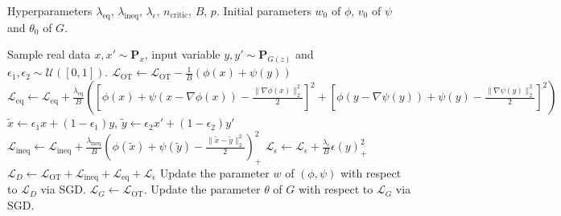 \documentclass[runningheads]{llncs}
\begin{document}
\begin{algorithm}[t]
  \caption{W2GAN with $D = (\phi, \psi)$ and $L^2$-regularization.}
  \label{alg:example2}
\begin{algorithmic}
  \REQUIRE Hyperparameters $\lambda_\mathrm{eq}$, $\lambda_\mathrm{ineq}$, $\lambda_{\epsilon}$, $n_\mathrm{critic}$, $B$, $p$.
  \REQUIRE Initial parameters $w_0$ of $\phi$, $v_0$ of $\psi$ and $\theta_0$ of $G$.
  
  \STATE Sample real data $x,x' \sim \mathbf{P}_x$, input variable $y,y' \sim \mathbf{P}_{G(z)}$ and $\epsilon_1, \epsilon_2 \sim \mathcal{U}([0,1])$.
  \STATE $\mathcal{L}_{\text{OT}} \leftarrow \mathcal{L}_{\text{OT}} - \frac{1}{B}(\phi(x) + \psi(y))$
  \STATE $\mathcal{L}_{\text{eq}} \leftarrow \mathcal{L}_{\text{eq}} + \frac{\lambda_{\text{eq}}}{B}([\phi(x) + \psi(x-\nabla \phi(x))-\frac{\|\nabla \phi(x)\|_2^2}{2}]^2 + [\phi(y-\nabla \psi(y)) + \psi(y)-\frac{\|\nabla \psi(y)\|_2^2}{2}]^2)$
  \STATE $\tilde{x} \leftarrow \epsilon_1 x+ (1-\epsilon_1) y$, $\tilde{y} \leftarrow \epsilon_2 x'+ (1-\epsilon_2) y'$
  \STATE \STATE $\mathcal{L}_{\text{ineq}} \leftarrow \mathcal{L}_{\text{ineq}} + \frac{\lambda_{\text{ineq}}}{B}(\phi(\tilde{x}) + \psi(\tilde{y})- \frac{\|\tilde{x}-\tilde{y}\|_2^2}{2})_+^2$
  \STATE \STATE $\mathcal{L}_{\epsilon}\leftarrow \mathcal{L}_{\epsilon} + \frac{ \lambda_{\epsilon}}{B}\epsilon(y)_+^2$
  \ENDFOR
  \STATE $\mathcal{L}_D \leftarrow \mathcal{L}_{\text{OT}} +\mathcal{L}_{\text{ineq}} +\mathcal{L}_{\text{eq}}+\mathcal{L}_{\epsilon}$
  \STATE Update the parameter $w$ of $(\phi,\psi)$ with respect to $\mathcal{L}_D$ via SGD.
  \ENDFOR
  \STATE $\mathcal{L}_G \leftarrow \mathcal{L}_{\text{OT}}$.
  \STATE Update the parameter $\theta$ of $G$ with respect to $\mathcal{L}_G$ via SGD.
  \ENDWHILE
\end{algorithmic}
\end{algorithm}
\end{document}

